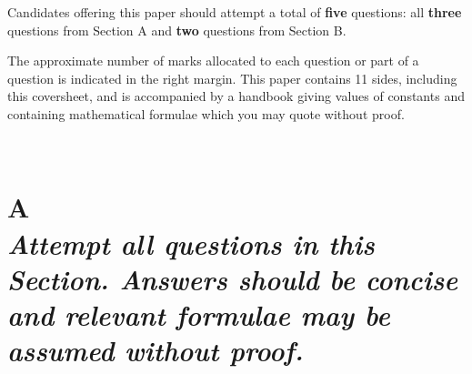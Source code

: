\documentclass[txfonts]{NSTexam}
\begin{document}
\date{Friday 3rd June 2022 :00 to 11:00} %
\paper{\phantom{MOO}}
\begin{rubric}Candidates offering this paper should attempt a total of \textbf{five} questions: all \textbf{three} questions from Section A and \textbf{two} questions from Section B.

\vspace{0.8 cm}
\vspace{0.8 cm}

The approximate number of marks allocated to each question or part of a question is indicated in the right margin. This paper contains 11 sides, including this coversheet, and is accompanied by a handbook giving values of constants and containing mathematical formulae which you may quote without proof.
\end{rubric}

 \warning


\clearpage
\newpage

~
\newpage

\thispagestyle{turnover}

\section{A \\ \em Attempt \textbf{all} questions in this Section.  Answers should be concise and relevant formulae may be assumed without proof.}
\end{document}
